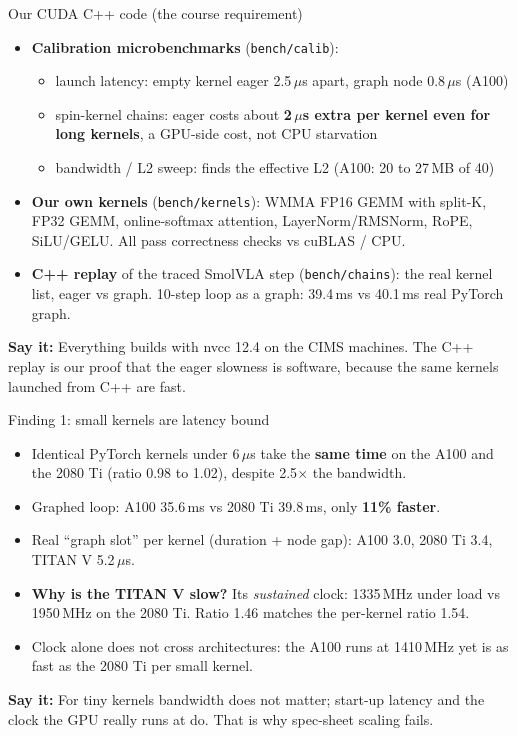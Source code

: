 \documentclass[aspectratio=169,10pt]{beamer}
\newcommand{\say}[1]{\par\vfill\noindent\colorbox{soft}{\parbox{\dimexpr\textwidth-2\fboxsep\relax}{\small\textbf{\textcolor{accent}{Say it:}} #1}}}
\begin{document}
\begin{frame}{Our CUDA C++ code (the course requirement)}
\begin{itemize}
\item \textbf{Calibration microbenchmarks} (\texttt{bench/calib}):
  \begin{itemize}\small
  \item launch latency: empty kernel eager 2.5\,$\mu$s apart, graph node 0.8\,$\mu$s (A100)
  \item spin-kernel chains: eager costs about \textbf{2\,$\mu$s extra per kernel even for
    long kernels}, a GPU-side cost, not CPU starvation
  \item bandwidth / L2 sweep: finds the effective L2 (A100: 20 to 27\,MB of 40)
  \end{itemize}
\item \textbf{Our own kernels} (\texttt{bench/kernels}): WMMA FP16 GEMM with split-K, FP32 GEMM,
  online-softmax attention, LayerNorm/RMSNorm, RoPE, SiLU/GELU. All pass correctness checks
  vs cuBLAS / CPU.
\item \textbf{C++ replay} of the traced SmolVLA step (\texttt{bench/chains}): the real kernel
  list, eager vs graph. 10-step loop as a graph: 39.4\,ms vs 40.1\,ms real PyTorch graph.
\end{itemize}
\say{Everything builds with nvcc 12.4 on the CIMS machines. The C++ replay is our proof that
the eager slowness is software, because the same kernels launched from C++ are fast.}
\end{frame}

\begin{frame}{Finding 1: small kernels are latency bound}
\begin{itemize}
\item Identical PyTorch kernels under 6\,$\mu$s take the \textbf{same time} on the A100 and the
  2080 Ti (ratio 0.98 to 1.02), despite 2.5$\times$ the bandwidth.
\item Graphed loop: A100 35.6\,ms vs 2080 Ti 39.8\,ms, only \textbf{11\% faster}.
\item Real ``graph slot'' per kernel (duration + node gap): A100 3.0, 2080 Ti 3.4, TITAN V
  5.2\,$\mu$s.
\item \textbf{Why is the TITAN V slow?} Its \emph{sustained} clock: 1335\,MHz under load vs
  1950\,MHz on the 2080 Ti. Ratio 1.46 matches the per-kernel ratio 1.54.
\item Clock alone does not cross architectures: the A100 runs at 1410\,MHz yet is as fast as
  the 2080 Ti per small kernel.
\end{itemize}
\say{For tiny kernels bandwidth does not matter; start-up latency and the clock the GPU really
runs at do. That is why spec-sheet scaling fails.}
\end{frame}
\end{document}
